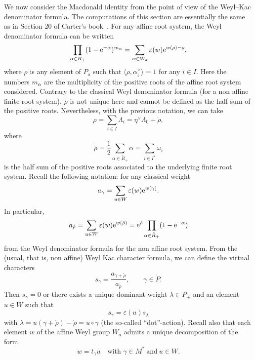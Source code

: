 \documentclass[10pt,a4paper]{amsart}
\numberwithin{equation}{section}
\newcommand{\al}{\alpha}
\begin{document}
We now consider the Macdonald identity from the point of view of the Weyl--Kac
denominator formula. The computations of this section are essentially the same
as in Section 20 of Carter's book~\cite{carter_affine}. For any affine root
system, the Weyl denominator formula can be written
\begin{equation}
\prod_{\alpha\in R_{+}}(1-{\rm e}^{-\alpha})^{m_{\alpha}}=\sum_{w\in W_{a}%
}\varepsilon(w){\rm e}^{w(\rho)-\rho},\label{WKDF}%
\end{equation}
where $\rho$ is any element of $P_{a}$ such that $\bigl\langle\rho,\al_i^\vee\bigr\rangle=1$
for any $i\in I$. Here the numbers $m_{\alpha}$ are the multiplicity of the
positive roots of the affine root system considered. Contrary to the classical
Weyl denominator formula (for a non affine finite root system), $\rho$ is not
unique here and cannot be defined as the half sum of the positive roots.
Nevertheless, with the previous notation, we can take%
\[
\rho=\sum_{i\in I}\Lambda_{i}=\eta^{\vee}\Lambda_{0}+\mathring{\rho},%
\]
where
\[
\mathring{\rho}=\frac{1}{2}\sum_{\alpha\in\mathring{R}_{+}}\alpha=\sum_{i \in
	I^{*}}\omega_{i}%
\]
is the half sum of the positive roots associated to the underlying finite root
system. Recall the following notation: for any classical weight %
\[
a_{\gamma}=\sum_{u\in W}\varepsilon(w){\rm e}^{w(\gamma)}.
\]
In particular,
\[
a_{\mathring{\rho}}=\sum_{u\in W}\varepsilon(w){\rm e}^{w(\mathring{\rho})}={\rm e}^{
	\mathring{\rho}}\prod_{\alpha\in\mathring{R}_{+}}(1-{\rm e}^{-\alpha})
\]
from the Weyl denominator formula for the non affine root system. From the
(usual, that is, non affine) Weyl Kac character formula, we can define the
virtual characters%
\[
s_{\gamma}=\frac{a_{\gamma+\mathring{\rho}}}{a_{\mathring{\rho}}},\qquad\gamma
\in\mathring{P}.
\]
Then $s_{\gamma}=0$ or there exists a unique dominant weight $\lambda\in
P_{+}$ and an element $u\in W$ such that
\begin{equation}
s_{\gamma}=\varepsilon(u)s_{\lambda}\label{SR}%
\end{equation}
with $\lambda=u(\gamma+\mathring{\rho})-\mathring{\rho}=u\circ\gamma$ (the
so-called ``dot''-action). Recall also that each element $w$ of the affine Weyl
group $W_{a}$ admits a unique decomposition of the form%
\[
w=t_{\gamma}u \quad \text{with }\gamma\in M^{\ast} \ \text{and}\ u\in W.
\]
\end{document}
